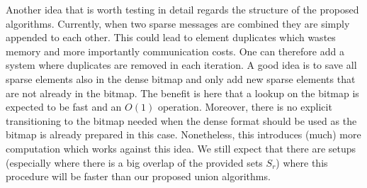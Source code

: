 Another idea that is worth testing in detail regards the structure of the proposed algorithms. Currently, when two sparse messages are combined they are simply appended to each other. This could lead to element duplicates which wastes memory and more importantly communication costs. One can therefore add a system where duplicates are removed in each iteration. A good idea is to save all sparse elements also in the dense bitmap and only add new sparse elements that are not already in the bitmap. The benefit is here that a lookup on the bitmap is expected to be fast and an $O(1)$ operation. Moreover, there is no explicit transitioning to the bitmap needed when the dense format should be used as the bitmap is already prepared in this case. Nonetheless, this introduces (much) more computation which works against this idea. We still expect that there are setups (especially where there is a big overlap of the provided sets $S_r$) where this procedure will be faster than our proposed union algorithms. 













